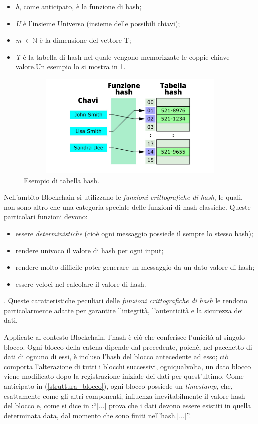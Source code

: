 \begin{itemize}
    \item \textit{h}, come anticipato, è la funzione di hash;
    \item \textit{U} è l'insieme Universo (insieme delle possibili chiavi);
    \item \textit{m} $\in \mathbb{N}$ è la dimensione del vettore T;
    \item \textit{T} è la tabella di hash nel quale vengono memorizzate le coppie chiave-valore.Un esempio lo si mostra in \ref{tabella_hash}.
\end{itemize}
\begin{figure} [h]
    \centering
    \includegraphics[width=12cm,height=5cm]{Immagini/Chavi.png}
    \caption[Esempio di tabella hash]{Esempio di tabella hash.}
    \label{tabella_hash}
\end{figure}

Nell'ambito Blockchain si utilizzano le \textit{funzioni crittografiche di hash}, le quali, non sono altro che una categoria speciale delle funzioni di hash classiche. Queste particolari funzioni devono:

\begin{itemize}
    \item essere \textit{deterministiche} (cioè ogni messaggio possiede il sempre lo stesso hash);
    \item rendere univoco il valore di hash per ogni input;
    \item rendere molto difficile poter generare un messaggio da un dato valore di hash;
    \item essere veloci nel calcolare il valore di hash.
\end{itemize}.  
Queste caratteristiche peculiari delle \textit{funzioni crittografiche di hash} le rendono particolarmente adatte per garantire l'integrità, l'autenticità e la sicurezza dei dati.

Applicate al contesto Blockchain, l'hash è ciò che conferisce l'unicità al singolo blocco. Ogni blocco della catena dipende dal precedente, poiché, nel pacchetto di dati di ognuno di essi, è incluso l’hash del blocco antecedente ad esso; ciò comporta l'alterazione di tutti i blocchi successivi, ogniqualvolta, un dato blocco viene modificato dopo la registrazione iniziale dei dati per quest'ultimo.
Come anticipato in (\ref{struttura_blocco}), ogni blocco possiede un \textit{timestamp}, che, esattamente come gli altri componenti, influenza inevitabilmente il valore hash del blocco e, come si dice in \cite{bitcoin}:“[...] prova che i dati devono essere esistiti in quella determinata data, dal momento che sono finiti nell'hash.[...]”.

